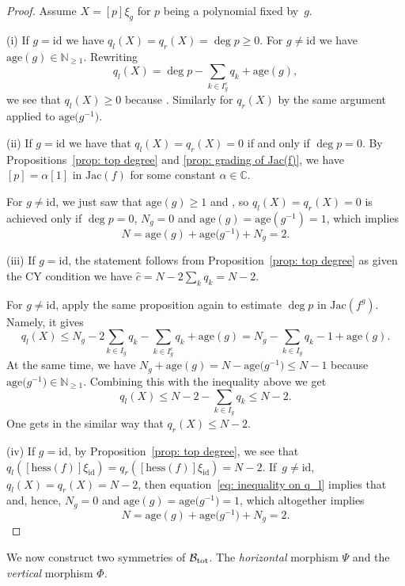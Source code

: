 \documentclass[10pt,a4paper]{amsart}
\numberwithin{equation}{section}
\newcommand{\CC}{{\mathbb{C}}}
\newcommand{\NN}{{\mathbb{N}}}
\newcommand{\Jac}{\mathrm{Jac}}
\newcommand{\id}{\mathrm{id}}
\newcommand{\hess}{\mathrm{hess}}
\newcommand{\age}{\mathrm{age}}
\def\B{{\mathcal B}}
\begin{document}
\begin{proof}
	Assume $X = [p]\xi_g$ for $p$ being a polynomial fixed by~$g$.

	(i) If $g = \id$ we have $q_l(X) = q_r(X) = \deg p \ge 0$. For $g \neq \id$ we have $\age(g) \in \NN_{\ge 1}$. Rewriting
	\[
		q_l(X) = \deg p -\sum_{k \in I_g^c} q_{k} + \age(g),
	\]
	we see that $q_l(X) \ge 0$ because . Similarly for $q_r(X)$ by the same argument applied to $\age\bigl(g^{-1}\bigr)$.

	(ii) If $g = \id$ we have that $q_l(X) = q_r(X) = 0$ if and only if $\deg p = 0$. By Propositions~\ref{prop: top degree} and \ref{prop: grading of Jac(f)}, we have $[p] = \alpha [1]$ in $\Jac(f)$ for some constant $\alpha \in \CC$.

	For $g \neq \id$, we just saw that $\age(g)\ge 1$ and , so $q_l(X) = q_r(X) = 0$ is achieved only if $\deg p=0$, $N_g=0$ and $\age(g)=\age(g^{-1})=1$, which implies \[N=\age(g)+\age\bigl(g^{-1}\bigr)+N_g=2.\]


	(iii) If $g=\id$, the statement follows from Proposition~\ref{prop: top degree} as given the CY condition we have $\hat{c}=N-2\sum_k q_k=N-2$.

 For $g \neq \id $, apply the same proposition again to estimate $\deg p$ in $\Jac(f^g)$. Namely, it gives
	\[
		q_l(X) \le N_g - 2\sum_{k \in I_g}q_k - \sum_{k \in I_g^c} q_{k}+ \age(g) = N_g - \sum_{k \in I_g}q_k -1 + \age(g).
	\]
	At the same time, we have $N_g + \age(g) = N - \age\bigl(g^{-1}\bigr) \le N-1$ because $\age\bigl(g^{-1}\bigr) \in \NN_{\ge 1}$. Combining this with the inequality above we get
\begin{equation}\label{eq: inequality on q_l}
		q_l(X) \le N - 2 - \sum_{k \in I_g}q_k \le N - 2.
\end{equation}
	One gets in the similar way that $q_r(X) \le N-2$.

	(iv) If $g = \id$, by Proposition~\ref{prop: top degree}, we see that $q_l([\hess(f)]\xi_\id)=q_r([\hess(f)]\xi_\id)=N-2$. If~$g \neq \id$, $q_l(X) = q_r(X) = N-2$, then equation~\eqref{eq: inequality on q_l} implies that  and, hence, $N_g=0$ and $\age(g)=\age\bigl(g^{-1}\bigr)=1$, which altogether implies \[N=\age(g)+\age\bigl(g^{-1}\bigr)+N_g=2.\tag*{\qed} \]\renewcommand{\qed}{}
\end{proof}

We now construct two symmetries of $\B_{\rm tot}$. The \textit{horizontal} morphism $\Psi$ and the \textit{vertical} morphism $\Phi$.
\end{document}
